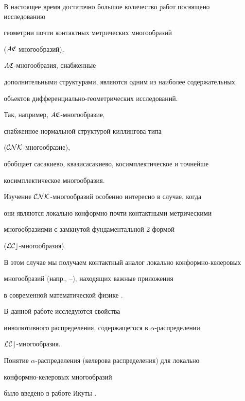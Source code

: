 \label{begin}










 


В настоящее время достаточно большое количество работ посвящено исследованию 


геометрии почти контактных метрических многообразий


($A\frak C$-многообразий).\;


$A\frak C$-много\-об\-ра\-зия, снабженные 


дополнительными структурами, являются одним из наиболее содержательных 


объектов дифференциально-геометрических исследований. 


Так, например, $A\frak C$-многообразие,


снабженное нормальной структурой киллингова типа


($\cal{CNK}$-многообразие), 


обобщает сасакиево, квазисасакиево, косимплектическое и точнейше 


косимплектическое многообразия. 


Изучение $\cal{CNK}$-многообразий особенно интересно в случае, когда 


они являются локально конформно почти контактными метрическими 


многообразиями с замкнутой фундаментальной 2-формой 


($\cal LCc$-многообразия). 


В этом случае мы получаем контактный аналог локально конформно-келеровых 


многообразий (напр., \cite{1}--\cite{4}), находящих важные приложения 


в современной математической физике \cite{5}.





В данной работе исследуются свойства 


инволютивного распределения, содержащегося в $\alpha$-распределении 


$\cal LCc$-многообразия.


Понятие $\alpha$-распределения (келерова распределения) для локально 


конформно-келеровых многообразий 


было введено в работе Икуты \cite{6}. 


